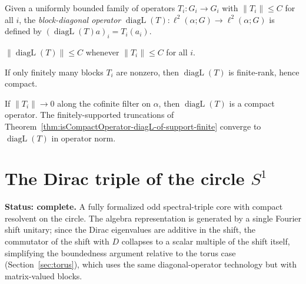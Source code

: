 \begin{definition}
  \label{def:diagL}
  \leanok
  Given a uniformly bounded family of operators $T_i \colon G_i \to G_i$ with $\|T_i\| \le C$
  for all $i$, the \emph{block-diagonal operator} $\operatorname{diagL}(T) \colon
  \ell^2(\alpha; G) \to \ell^2(\alpha; G)$ is defined by $(\operatorname{diagL}(T) a)_i =
  T_i(a_i)$.
\end{definition}

\begin{lemma}
  \label{lem:norm-diagL-le}
  \leanok
  $\|\operatorname{diagL}(T)\| \le C$ whenever $\|T_i\| \le C$ for all $i$.
\end{lemma}

\begin{theorem}
  \label{thm:isCompactOperator-diagL-of-support-finite}
  \leanok
  If only finitely many blocks $T_i$ are nonzero, then $\operatorname{diagL}(T)$ is
  finite-rank, hence compact.
\end{theorem}

\begin{theorem}
  \label{thm:isCompactOperator-diagL}
  \leanok
  If $\|T_i\| \to 0$ along the cofinite filter on $\alpha$, then $\operatorname{diagL}(T)$ is
  a compact operator. The finitely-supported truncations of
  Theorem~\ref{thm:isCompactOperator-diagL-of-support-finite} converge to
  $\operatorname{diagL}(T)$ in operator norm.
\end{theorem}

\section{The Dirac triple of the circle \texorpdfstring{$S^1$}{S1}}
\label{sec:circle}

\textbf{Status: complete.} A fully formalized odd spectral-triple core with compact resolvent
on the circle. The algebra representation is generated by a single Fourier shift unitary; since the
Dirac eigenvalues are additive in the shift, the commutator of the shift with $D$ collapses to
a scalar multiple of the shift itself, simplifying the boundedness argument relative to the
torus case (Section~\ref{sec:torus}), which uses the same diagonal-operator technology but
with matrix-valued blocks.

